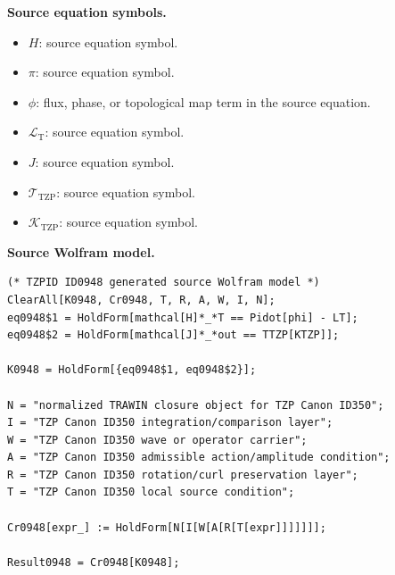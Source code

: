 \begin{minipage}[t]{0.49\linewidth}
\begingroup
\small
\raggedright
\textbf{Source equation symbols.}\par
\begin{itemize}[leftmargin=1.35em,itemsep=1pt,topsep=1pt,parsep=0pt]
    \item $H$: source equation symbol.
    \item $\pi$: source equation symbol.
    \item $\phi$: flux, phase, or topological map term in the source equation.
    \item $\mathcal{L}_{\mathrm{T}}$: source equation symbol.
    \item $J$: source equation symbol.
    \item $\mathcal{T}_{\mathrm{TZP}}$: source equation symbol.
    \item $\mathcal{K}_{\mathrm{TZP}}$: source equation symbol.
\end{itemize}
\endgroup
\end{minipage}\hfill
\begin{minipage}[t]{0.47\linewidth}
\begingroup
\scriptsize
\raggedright
\textbf{Source Wolfram model.}\par
\begin{Verbatim}[fontsize=\tiny,breaklines=true,breakanywhere=true]
(* TZPID ID0948 generated source Wolfram model *)
ClearAll[K0948, Cr0948, T, R, A, W, I, N];
eq0948$1 = HoldForm[mathcal[H]*_*T == Pidot[phi] - LT];
eq0948$2 = HoldForm[mathcal[J]*_*out == TTZP[KTZP]];

K0948 = HoldForm[{eq0948$1, eq0948$2}];

N = "normalized TRAWIN closure object for TZP Canon ID350";
I = "TZP Canon ID350 integration/comparison layer";
W = "TZP Canon ID350 wave or operator carrier";
A = "TZP Canon ID350 admissible action/amplitude condition";
R = "TZP Canon ID350 rotation/curl preservation layer";
T = "TZP Canon ID350 local source condition";

Cr0948[expr_] := HoldForm[N[I[W[A[R[T[expr]]]]]]];

Result0948 = Cr0948[K0948];
\end{Verbatim}
\endgroup
\end{minipage}

